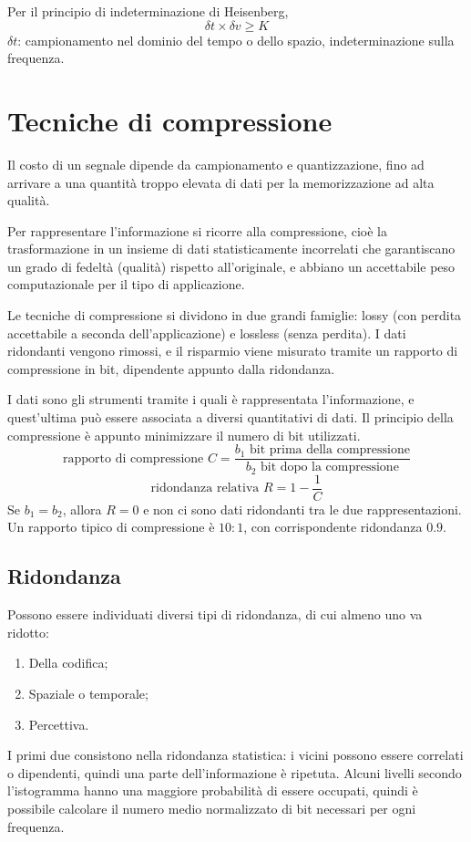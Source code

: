 Per il principio di indeterminazione di Heisenberg,
$$\delta t \times \delta v \geq K$$
$\delta t$: campionamento nel dominio del tempo o dello spazio, indeterminazione sulla frequenza. \\ %

\section{Tecniche di compressione}
Il costo di un segnale dipende da campionamento e quantizzazione, fino ad arrivare a una quantità troppo elevata di dati per la memorizzazione ad alta qualità.

Per rappresentare l'informazione si ricorre alla compressione, cioè la trasformazione in un insieme di dati statisticamente incorrelati che garantiscano un grado di fedeltà (qualità) rispetto all'originale, e abbiano un accettabile peso computazionale per il tipo di applicazione.

Le tecniche di compressione si dividono in due grandi famiglie: lossy (con perdita accettabile a seconda dell'applicazione) e lossless (senza perdita). I dati ridondanti vengono rimossi, e il risparmio viene misurato tramite un rapporto di compressione in bit, dipendente appunto dalla ridondanza. 

I dati sono gli strumenti tramite i quali è rappresentata l'informazione, e quest'ultima può essere associata a diversi quantitativi di dati. Il principio della compressione è appunto minimizzare il numero di bit utilizzati. 
$$\text{rapporto di compressione } C = \frac{b_1 \text{ bit prima della compressione}}{b_2 \text{ bit dopo la compressione}}$$
$$\text{ridondanza relativa } R = 1 - \frac{1}{C}$$
Se $b_1 = b_2$, allora $R = 0$ e non ci sono dati ridondanti tra le due rappresentazioni. Un rapporto tipico di compressione è $10 : 1$, con corrispondente ridondanza $0.9$.

\subsection{Ridondanza}
Possono essere individuati diversi tipi di ridondanza, di cui almeno uno va ridotto:
\begin{enumerate}
	\item Della codifica;
	\item Spaziale o temporale;
	\item Percettiva.
\end{enumerate}

I primi due consistono nella ridondanza statistica: i vicini possono essere correlati o dipendenti, quindi una parte dell'informazione è ripetuta. Alcuni livelli secondo l'istogramma hanno una maggiore probabilità di essere occupati, quindi è possibile calcolare il numero medio normalizzato di bit necessari per ogni frequenza. 






